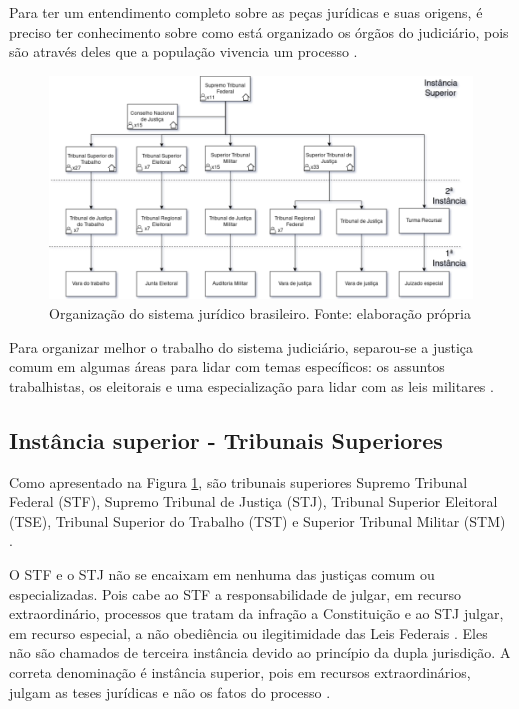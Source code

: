 Para ter um entendimento completo sobre as peças jurídicas e suas origens, é preciso ter conhecimento sobre como está organizado os órgãos do judiciário, pois são através deles que a população vivencia um processo \cite{JUNIOR2012}.

\begin{figure}[h]
	\centering
    \includegraphics[keepaspectratio=true,scale=0.4]{figuras/sistemaJudiciario}
	\caption[Sistema judiciário]{Organização do sistema jurídico brasileiro. Fonte: elaboração própria}
	\label{fig:sistemaJudiciario}
\end{figure}

Para organizar melhor o trabalho do sistema judiciário, separou-se a justiça comum em algumas áreas para lidar com temas específicos: os assuntos trabalhistas, os eleitorais e uma especialização para lidar com as leis militares \cite{JUNIOR2012}. 

\subsection{Instância superior - Tribunais Superiores}

Como apresentado na Figura \ref{fig:sistemaJudiciario}, são tribunais superiores Supremo Tribunal Federal (STF), Supremo Tribunal de Justiça (STJ), Tribunal Superior Eleitoral (TSE), Tribunal Superior do Trabalho (TST) e Superior Tribunal Militar (STM) \cite{BRASIL1988}.

O STF e o STJ não se encaixam em nenhuma das justiças comum ou especializadas. Pois cabe ao STF a responsabilidade de julgar, em recurso extraordinário, processos que tratam da infração a Constituição e ao STJ julgar, em recurso especial, a não obediência ou ilegitimidade das Leis Federais \cite{BRASIL1988}. Eles não são chamados de terceira instância devido ao princípio da dupla jurisdição. A correta denominação é instância superior, pois em recursos extraordinários, julgam as teses jurídicas e não os fatos do processo \cite{JUNIOR2012}.

